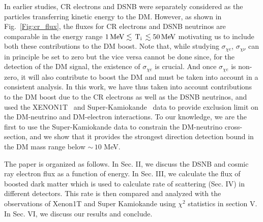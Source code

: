 \documentclass[11pt,prd,twocolumn,nofootinbib,reprint,superscriptaddress,longbibliography,colorlinks=true,citecolor=blue]{revtex4-1}
\begin{document}
In earlier studies, CR electrons and DSNB were separately considered as the particles transferring kinetic energy to the DM. However, as shown in Fig.~\ref{Fig:cr_flux}, the fluxes for
CR electrons and DSNB neutrinos are comparable in the energy range $1\,{\rm MeV} \lesssim \,{\rm T_i}\, \lesssim  50\,{\rm MeV}$ motivating us to include both these contributions
to the DM boost. Note that, while studying $\sigma_{\chi e}$, $\sigma_{\chi\nu}$ can in principle be set to zero but the vice versa cannot be done since, for the detection of
the DM signal, the existence of $\sigma_{\chi e}$ is crucial. And once $\sigma_{\chi e}$ is non-zero, it will also contribute to boost the DM and must be taken into account in a consistent analysis.
In this work, we have thus taken into account contributions to the DM boost due to the CR electrons as well as the DSNB neutrinos, and used the 
 XENON1T~\cite{XENON:2020rca} and Super-Kamiokande~\cite{Super-Kamiokande:2011lwo} data to provide exclusion limit on the DM-neutrino and DM-electron interactions. To our knowledge, we are the first to use the Super-Kamiokande data to constrain the  DM-neutrino cross-section, and we show that it provides the strongest direction detection bound in the DM mass range below $\sim \, 10$ MeV. 
 
 The paper is organized as follows. In Sec. II, we discuss the DSNB and cosmic ray electron flux as a function of energy. In Sec. III, we calculate the flux of boosted dark matter which is used to calculate rate of scattering (Sec. IV) in different detectors. This rate is then compared and analyzed with the observations of Xenon1T and Super Kamiokande using $\chi^2$ statistics in section V. In Sec. VI, we discuss our results and conclude.
\end{document}
